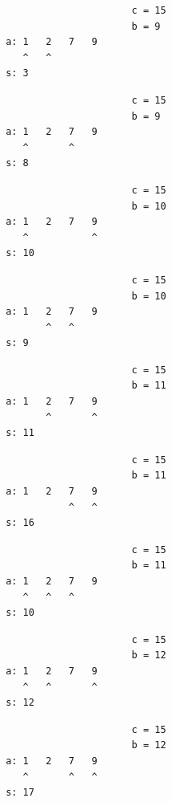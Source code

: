 { \begin{verbatim}
                             c = 15
                             b = 9
       a: 1   2   7   9
          ^   ^            
       s: 3
\end{verbatim} }

{ \begin{verbatim}
                             c = 15
                             b = 9
       a: 1   2   7   9
          ^       ^        
       s: 8
\end{verbatim} }

{ \begin{verbatim}
                             c = 15
                             b = 10
       a: 1   2   7   9
          ^           ^    
       s: 10
\end{verbatim} }

{ \begin{verbatim}
                             c = 15
                             b = 10
       a: 1   2   7   9
              ^   ^        
       s: 9
\end{verbatim} }

{ \begin{verbatim}
                             c = 15
                             b = 11
       a: 1   2   7   9
              ^       ^    
       s: 11
\end{verbatim} }

{ \begin{verbatim}
                             c = 15
                             b = 11
       a: 1   2   7   9
                  ^   ^    
       s: 16
\end{verbatim} }

{ \begin{verbatim}
                             c = 15
                             b = 11
       a: 1   2   7   9
          ^   ^   ^        
       s: 10
\end{verbatim} }

{ \begin{verbatim}
                             c = 15
                             b = 12
       a: 1   2   7   9
          ^   ^       ^    
       s: 12
\end{verbatim} }

{ \begin{verbatim}
                             c = 15
                             b = 12
       a: 1   2   7   9
          ^       ^   ^    
       s: 17
\end{verbatim} }

